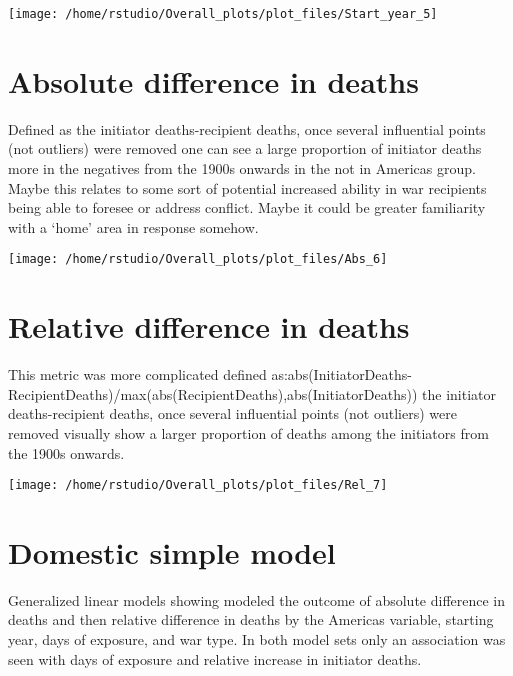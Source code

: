 \documentclass[
]{article}
\begin{document}
\texttt{[image: /home/rstudio/Overall\_plots/plot\_files/Start\_year\_5]}

\hypertarget{absolute-difference-in-deaths}{%
\section{Absolute difference in
deaths}\label{absolute-difference-in-deaths}}

Defined as the initiator deaths-recipient deaths, once several
influential points (not outliers) were removed one can see a large
proportion of initiator deaths more in the negatives from the 1900s
onwards in the not in Americas group. Maybe this relates to some sort of
potential increased ability in war recipients being able to foresee or
address conflict. Maybe it could be greater familiarity with a `home'
area in response somehow.

\texttt{[image: /home/rstudio/Overall\_plots/plot\_files/Abs\_6]}

\hypertarget{relative-difference-in-deaths}{%
\section{Relative difference in
deaths}\label{relative-difference-in-deaths}}

This metric was more complicated defined
as:abs(InitiatorDeaths-RecipientDeaths)/max(abs(RecipientDeaths),abs(InitiatorDeaths))
the initiator deaths-recipient deaths, once several influential points
(not outliers) were removed visually show a larger proportion of deaths
among the initiators from the 1900s onwards.

\texttt{[image: /home/rstudio/Overall\_plots/plot\_files/Rel\_7]}

\hypertarget{domestic-simple-model}{%
\section{Domestic simple model}\label{domestic-simple-model}}

Generalized linear models showing modeled the outcome of absolute
difference in deaths and then relative difference in deaths by the
Americas variable, starting year, days of exposure, and war type. In
both model sets only an association was seen with days of exposure and
relative increase in initiator deaths.
\end{document}
